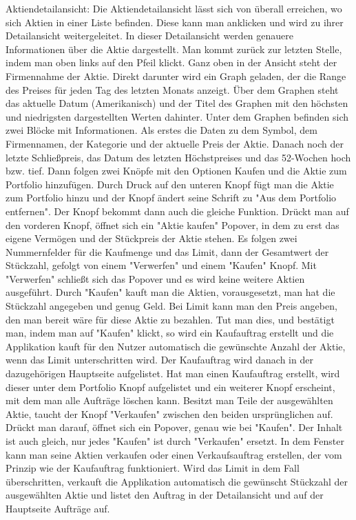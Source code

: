 \documentclass[10pt]{scrartcl}
\begin{document}
Aktiendetailansicht:
Die Aktiendetailansicht lässt sich von überall erreichen, wo sich Aktien in einer Liste befinden. Diese kann man anklicken und wird zu ihrer Detailansicht weitergeleitet. In dieser Detailansicht werden genauere Informationen über die Aktie dargestellt. Man kommt zurück zur letzten Stelle, indem man oben links auf den Pfeil klickt.
Ganz oben in der Ansicht steht der Firmennahme der Aktie. Direkt darunter wird ein Graph geladen, der die Range des Preises für jeden Tag des letzten Monats anzeigt. Über dem Graphen steht das aktuelle Datum (Amerikanisch) und der Titel des Graphen mit den höchsten und niedrigsten dargestellten Werten dahinter. 
Unter dem Graphen befinden sich zwei Blöcke mit Informationen. Als erstes die Daten zu dem Symbol, dem Firmennamen, der Kategorie und der aktuelle Preis der Aktie. Danach noch der letzte Schließpreis, das Datum des letzten Höchstpreises und das 52-Wochen hoch bzw. tief.
Dann folgen zwei Knöpfe mit den Optionen Kaufen und die Aktie zum Portfolio hinzufügen.
Durch Druck auf den unteren Knopf fügt man die Aktie zum Portfolio hinzu und der Knopf ändert seine Schrift zu "Aus dem Portfolio entfernen". Der Knopf bekommt dann auch die gleiche Funktion.
Drückt man auf den vorderen Knopf, öffnet sich ein "Aktie kaufen" Popover, in dem zu erst das eigene Vermögen und der Stückpreis der Aktie stehen. Es folgen zwei Nummernfelder für die Kaufmenge und das Limit, dann der Gesamtwert der Stückzahl, gefolgt von einem "Verwerfen" und einem "Kaufen" Knopf. Mit "Verwerfen" schließt sich das Popover und es wird keine weitere Aktien ausgeführt. Durch "Kaufen" kauft man die Aktien, vorausgesetzt, man hat die Stückzahl angegeben und genug Geld. Bei Limit kann man den Preis angeben, den man bereit wäre für diese Aktie zu bezahlen. Tut man dies, und bestätigt man, indem man auf "Kaufen" klickt, so wird ein Kaufauftrag erstellt und die Applikation kauft für den Nutzer automatisch die gewünschte Anzahl der Aktie, wenn das Limit unterschritten wird. Der Kaufauftrag wird danach in der dazugehörigen Hauptseite aufgelistet. Hat man einen Kaufauftrag erstellt, wird dieser unter dem Portfolio Knopf aufgelistet und ein weiterer Knopf erscheint, mit dem man alle Aufträge löschen kann.
Besitzt man Teile der ausgewählten Aktie, taucht der Knopf "Verkaufen" zwischen den beiden ursprünglichen auf. Drückt man darauf, öffnet sich ein Popover, genau wie bei "Kaufen". Der Inhalt ist auch gleich, nur jedes "Kaufen" ist durch "Verkaufen" ersetzt. In dem Fenster kann man seine Aktien verkaufen oder einen Verkaufsauftrag erstellen, der vom Prinzip wie der Kaufauftrag funktioniert. Wird das Limit in dem Fall überschritten, verkauft die Applikation automatisch die gewünscht Stückzahl der ausgewählten Aktie und listet den Auftrag in der Detailansicht und auf der Hauptseite Aufträge auf.
	
\end{document}
